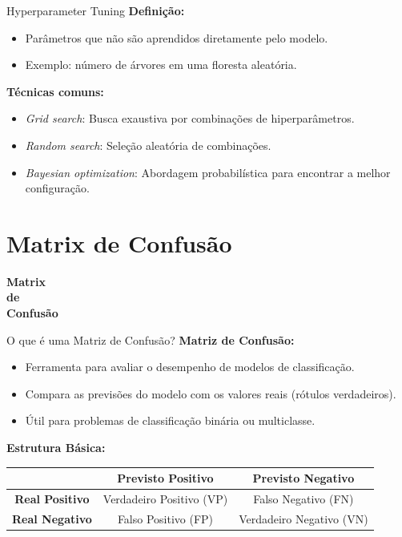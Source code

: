 \documentclass{beamer}
\begin{document}
\begin{frame}{Hyperparameter Tuning}
    \textbf{Definição:}
    \begin{itemize}
        \item Parâmetros que não são aprendidos diretamente pelo modelo.
        \item Exemplo: número de árvores em uma floresta aleatória.
    \end{itemize}

    \vspace{0.5cm}
    \textbf{Técnicas comuns:}
    \begin{itemize}
        \item \textit{Grid search}: Busca exaustiva por combinações de hiperparâmetros.
        \item \textit{Random search}: Seleção aleatória de combinações.
        \item \textit{Bayesian optimization}: Abordagem probabilística para encontrar a melhor configuração.
    \end{itemize}
\end{frame}

\section{Matrix de Confusão}
\begin{frame}
\centering
\Huge
\textbf{Matrix \\de\\ Confusão}
\end{frame}
\begin{frame}{O que é uma Matriz de Confusão?}
    \textbf{Matriz de Confusão:}
    \begin{itemize}
        \item Ferramenta para avaliar o desempenho de modelos de classificação.
        \item Compara as previsões do modelo com os valores reais (rótulos verdadeiros).
        \item Útil para problemas de classificação binária ou multiclasse.
    \end{itemize}

    \textbf{Estrutura Básica:}
    \begin{table}[]
        \begin{tabular}{|c|c|c|}
            \hline
            & \textbf{Previsto Positivo} & \textbf{Previsto Negativo} \\ \hline
            \textbf{Real Positivo} & Verdadeiro Positivo (VP) & Falso Negativo (FN) \\ \hline
            \textbf{Real Negativo} & Falso Positivo (FP) & Verdadeiro Negativo (VN) \\ \hline
        \end{tabular}
    \end{table}
\end{frame}
\end{document}
